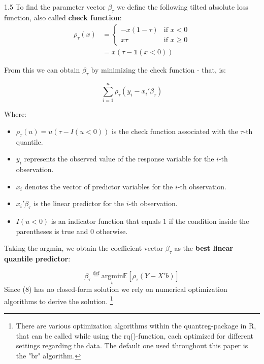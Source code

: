 \documentclass[conference]{IEEEtran}
\begin{document}
\begin{spacing}{1.5}
To find the parameter vector  $\beta_{\tau}$ we define the following tilted absolute loss function, also called \textbf{check function}:
\begin{equation}
\begin{aligned}
\rho_{\tau}(x) &=
\begin{cases}
		-x (1- \tau) & \text{if } x < 0 \\
		x \tau & \text{if } x \geq 0
\end{cases} \\
	&= x(\tau - \mathds{1}(x < 0))
\end{aligned}
\end{equation}

From this we can obtain $\beta_{\tau}$ by minimizing the check function - that, is:

\begin{equation}
\sum_{i = 1}^{n} \rho_{\tau}(y_{i} - x_{i}'\beta_{\tau})
\end{equation}

Where:
\begin{itemize}
  \item $\rho_{\tau}(u) = u(\tau - I(u < 0))$ is the check function associated with the $\tau$-th quantile.
  \item $y_i$ represents the observed value of the response variable for the $i$-th observation.
  \item $x_i$ denotes the vector of predictor variables for the $i$-th observation.
  \item $x_i'\beta_{\tau}$ is the linear predictor for the $i$-th observation.
  \item $I(u < 0)$ is an indicator function that equals $1$ if the condition inside the parentheses is true and $0$ otherwise.
\end{itemize}

Taking the argmin, we obtain the coefficient vector $\beta_{\tau}$ as the \textbf{best linear quantile predictor}:

\begin{equation}
\beta_{\tau} \overset{\operatorname{def}}{=} \underset{b}{\mathrm{argmin}} \mathbb{E}[ \rho_{\tau}(Y - X' b)]
\end{equation}
Since (8) has no closed-form solution we rely on numerical optimization algorithms to derive the solution. \footnote{There are various optimization algorithms within the quantreg-package in R, that can be called while using the rq()-function, each optimized for different settings regarding the data. The default one used throughout this paper is the "br" algorithm.}



\end{spacing}
\end{document}
